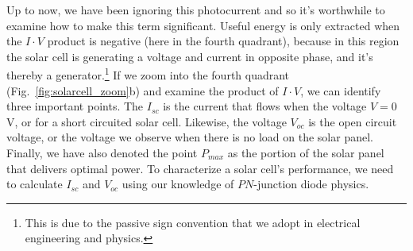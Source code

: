Up to now, we have been ignoring this photocurrent and so it's worthwhile to examine how to make this term significant.  Useful energy is only extracted when the $I\cdot V$ product is negative (here in the fourth quadrant), because in this region the solar cell is generating a voltage and current in opposite phase, and it's thereby a generator.\footnote{This is due to the passive sign convention that we adopt in electrical engineering and physics.}  If we zoom into the fourth quadrant (Fig.~\ref{fig:solarcell_zoom}b) and examine the product of $I\cdot V$, we can identify three important points.  The $I_{sc}$ is the current that flows when the voltage $V = 0$V, or for a short circuited solar cell.  Likewise, the voltage $V_{oc}$ is the open circuit voltage, or the voltage we observe when there is no load on the solar panel.  Finally, we have also denoted the point $P_{max}$ as the portion of the solar panel that delivers optimal power.
To characterize a solar cell's performance, we need to calculate $I_{sc}$ and $V_{oc}$ using our knowledge of $PN$-junction diode physics.
